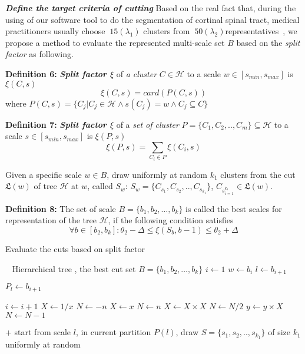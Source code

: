 \textbf{\textit{Define the target criteria of cutting}}
Based on the real fact that, during the using of our software tool to do the segmentation of cortinal spinal tract, medical practitioners usually choose $~15 (\lambda_1)$ clusters from $~50 (\lambda_2)$representatives~\cite{prni2013-boi}, we propose a method to evaluate the represented multi-scale set $\mathsf{\textit{B}}$ based on the \textit{split factor} as following.

\textbf{Definition 6:} \textbf{\textit{Split factor $\xi$}} of \textit{a cluster} $C \in \mathcal{H}$ to a scale $w \in [s_{min},s_{max}]$ is $\xi(C,s)$
\begin{equation}
\xi(C,s) = card(P(C,s))
\end{equation}
where $P(C,s) = \{ C_j | C_j \in \mathcal{H} \wedge s(C_j) = w \wedge C_j \subseteq C \}$ 

\textbf{Definition 7:} \textbf{\textit{Split factor $\xi$}} of a \textit{set of cluster} $P=\{C_1, C_2,.., C_m\} \subseteq \mathcal{H}$ to a scale $s \in [s_{min},s_{max}]$ is $\xi(P,s)$
\begin{equation}
\xi(P,s) = \sum_{C_i \in P}\xi(C_i,s)
\end{equation}

Given a specific scale $w \in \mathsf{\textit{B}}$, draw uniformly at random $k_1$ clusters from the cut $\mathfrak{L}(w)$ of tree $\mathcal{H}$ at $w$, called $S_w$: $S_{w}=\{C_{s_1}, C_{s_2},.., C_{s_{k_1}}\}$, $C_{s_{i=1}^{k_1}} \in \mathfrak{L}(w)$.

\textbf{Definition 8:} The set of scale $\mathsf{\textit{B}} = \{b_1, b_2, \ldots, b_k\}$ is called the best scales for representation of the tree $\mathcal{H}$, if the following condition satisfies
\begin{equation}
\forall b \in [b_2,b_k]: \theta_2 - \Delta \leq \xi(S_b,b-1) \leq \theta_2 + \Delta 
\end{equation}


\begin{algorithm}
\caption{Evaluate the cuts based on split factor}
\begin{algorithmic} 
\REQUIRE Hierarchical tree , the best cut set $\mathsf{\textit{B}} = \{b_1, b_2, \ldots, b_k\}$
\STATE $i \leftarrow 1$
\REPEAT 
\STATE $w \leftarrow b_i$
\STATE $l \leftarrow b_{i+1}$

\STATE $P_l \leftarrow b_{i+1}$

\STATE $i \leftarrow i + 1$
\STATE $X \leftarrow 1 / x$
\STATE $N \leftarrow -n$
\ELSE
\STATE $X \leftarrow x$
\STATE $N \leftarrow n$
\ENDIF
{}
\STATE $X \leftarrow X \times X$
\STATE $N \leftarrow N / 2$
\ELSE[$N$ is odd]
\STATE $y \leftarrow y \times X$
\STATE $N \leftarrow N - 1$
\ENDIF
\ENDWHILE
\end{algorithmic}
\end{algorithm}
+ start from scale $l$, in current partition $P(l)$, draw $S=\{s_1,s_2,..,s_{k_1}\}$ of size $k_1$ uniformly at random

